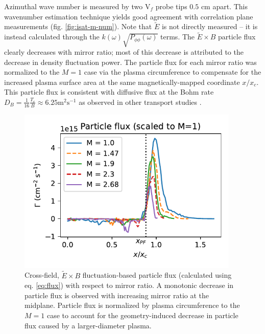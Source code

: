 Azimuthal wave number is measured by two V$_f$ probe tips $0.5$ cm apart. This wavenumber estimation technique yields good agreement with correlation plane measurements (fig. \ref{fig:isat-m-num}). Note that $\tilde{E}$ is not directly measured -- it is instead calculated through the $k(\omega) \sqrt{P_{\phi \phi} (\omega)}$ terms.
The $\tilde{E} \times B$ particle flux clearly decreases with mirror ratio; most of this decrease is attributed to the decrease in density fluctuation power. The particle flux for each mirror ratio was normalized to the $M=1$ case via the plasma circumference to compensate for the increased plasma surface area at the same magnetically-mapped coordinate $x/x_c$. This particle flux is consistent with diffusive flux at the Bohm rate $D_B = \frac{1}{16} \frac{T_e}{B} \approx 6.25 \text{m}^{2} \text{s}^{-1}$ as observed in other transport studies \cite{Maggs-Carter_2008}.
\begin{figure}
    \centering
    \includegraphics[width=300pt]{figures/fig8.pdf}
    \caption[Cross-field, $\tilde{E} \times B$ particle flux]{Cross-field, $\tilde{E} \times B$ fluctuation-based particle flux (calculated using eq. \ref{eq:flux}) with respect to mirror ratio. A monotonic decrease in particle flux is observed with increasing mirror ratio at the midplane. Particle flux is normalized by plasma circumference to the $M=1$ case to account for the geometry-induced decrease in particle flux caused by a larger-diameter plasma.}
    \label{fig:particle-flux}
\end{figure}

